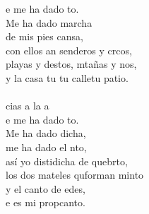 \begin{cancion}
	e me ha dado to.\\
	Me ha dado marcha \\
	de mis pies cansa,\\
	con ellos an senderos y crcos,\\
	playas y destos, mtañas y nos,\\
	y la casa tu tu calletu patio.\\
	\jump\\
	cias a la a \\
	e me ha dado to.\\
	Me ha dado dicha, \\
	me ha dado el nto,\\
	así yo distidicha de quebrto,\\
	los dos mateles quforman minto\\
	y el canto de edes, \\
	e es mi propcanto.\\
\end{cancion}%
